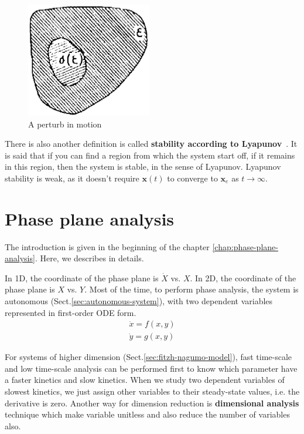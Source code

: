 \begin{figure}[hbt]
  \centerline{\includegraphics[height=5cm]{./images/perturb_vicinity.eps}}
  \caption{A perturb in motion}
  \label{fig:perturb}
\end{figure}

There is also another definition is called
{\bf stability according to Lyapunov}~\cite{andronow1949osci}. It is
said that if you can find a region from which the system start off, if
it remains in this region, then the system is stable, in the sense of
Lyapunov. Lyapunov stability is weak, as it doesn't require
$\mathbf{x}(t)$ to converge to $\mathbf{x}_e$ as $t\rightarrow
\infty$. 

\section{Phase plane analysis}
\label{sec:phase-plane-analysis}

The introduction is given in the beginning of the chapter
\ref{chap:phase-plane-analysis}. Here, we describes in details.

In 1D, the coordinate of the phase plane is $\dot{X}$ vs. $X$.
In 2D, the coordinate of the phase plane is $X$ vs. $Y$. Most of the time, to
perform phase analysis, the system is autonomous
(Sect.\ref{sec:autonomous-system}), with two dependent variables represented in
first-order ODE form.
\begin{equation}
  \label{eq:678}
  \begin{split}
    \dot{x} = f(x,y)\\
    \dot{y} = g(x,y)
  \end{split}
\end{equation} 

\begin{framed}

For systems of higher dimension (Sect.\ref{sec:fitzh-nagumo-model}), fast
time-scale and low time-scale analysis can be performed first to know which
parameter have a faster kinetics and slow kinetics. When we study two dependent
variables of slowest kinetics, we just assign other variables to their
steady-state values, i.e. the derivative is zero. Another way for dimension
reduction is {\bf dimensional analysis} technique which make variable unitless
and also reduce the number of variables also.
\end{framed}

